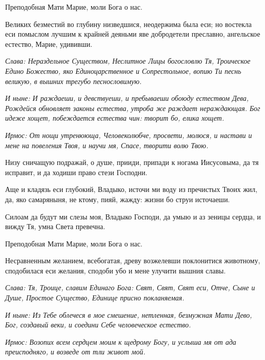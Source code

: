 Преподобная Мати Марие, моли Бога о нас.

\normalfont{}

Великих безместий во глубину низведшися, неодержима была еси; но востекла еси помыслом лучшим к крайней деяньми яве добродетели преславно, ангельское естество, Марие, удививши. 

\itshape Слава\normalfont{}: Нераздельное Существом, Неслитное Лицы богословлю Тя, Троическое Едино Божество, яко Единоцарственное и Сопрестольное, вопию Ти песнь великую, в вышних трегубо песнословимую. 

\itshape И ныне\normalfont{}: И раждаеши, и девствуеши, и пребываеши обоюду естеством Дева, Рождейся обновляет законы естества, утроба же раждает нераждающая. Бог идеже хощет, побеждается естества чин: творит бо, елика хощет.



\itshape Ирмос\normalfont{}: От нощи утренююща, Человеколюбче, просвети, молюся, и настави и мене на повеления Твоя, и научи мя, Спасе, творити волю Твою. 

Низу сничащую подражай, о душе, прииди, припади к ногама Иисусовыма, да тя исправит, и да ходиши право стези Господни. 

Аще и кладязь еси глубокий, Владыко, источи ми воду из пречистых Твоих жил, да, яко самаряныня, не ктому, пияй, жажду: жизни бо струи источаеши. 

Силоам да будут ми слезы моя, Владыко Господи, да умыю и аз зеницы сердца, и вижду Тя, умна Света превечна. 

\bfseries 

Преподобная Мати Марие, моли Бога о нас.

\normalfont{}

Несравненным желанием, всебогатая, древу возжелевши поклонитися животному, сподобилася еси желания, сподоби убо и мене улучити вышния славы. 

\itshape Слава\normalfont{}: Тя, Троице, славим Единаго Бога: Свят, Свят, Свят еси, Отче, Сыне и Душе, Простое Существо, Единице присно покланяемая. 

\itshape И ныне\normalfont{}: Из Тебе облечеся в мое смешение, нетленная, безмужная Мати Дево, Бог, создавый веки, и соедини Себе человеческое естество.



\itshape Ирмос\normalfont{}: Возопих всем сердцем моим к щедрому Богу, и услыша мя от ада преисподняго, и возведе от тли живот мой. 

